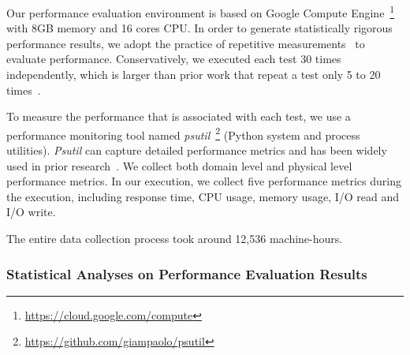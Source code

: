
Our performance evaluation environment is based on Google Compute Engine~\footnote{\url{https://cloud.google.com/compute}} with 8GB memory and 16 cores CPU. In order to generate statistically rigorous performance results, we adopt the practice of repetitive measurements~\cite{peterfse} to evaluate performance. Conservatively, we executed each test 30 times independently, which is larger than prior work that  %
repeat a test only 5 to 20 times~\cite{Laaber2018MSR, Leitner2016TIT,DBLP:journals/ese/LaaberSL19}. 

To measure the performance that is associated with each test, we %
use a performance monitoring tool named \emph{psutil}~\footnote{\url{https://github.com/giampaolo/psutil}} (Python system and process utilities). %
\emph{Psutil} can capture detailed performance metrics and has been widely used in prior research~\cite{DBLP:conf/icsm/ChenS17,DBLP:conf/wosp/YaoPSSTS18}. We collect both domain level and physical level performance metrics. In our execution, we collect five performance metrics during the execution, including response time, CPU usage, memory usage, I/O read and I/O write.

The entire data collection process took around 12,536 machine-hours.

\subsubsection{Statistical Analyses on Performance Evaluation Results}
\label{sec:statisticalAnalysis}

